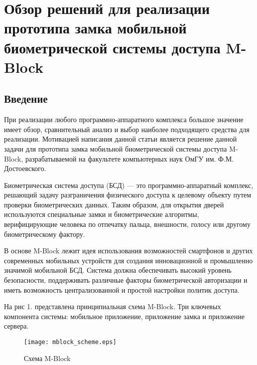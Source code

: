 \chapter{Обзор решений для реализации прототипа замка мобильной биометрической системы доступа M-Block} \label{chapt2}

\section*{Введение} %
При реализации любого программно-аппаратного комплекса большое значение имеет обзор, сравнительный анализ и выбор наиболее подходящего средства для реализации. Мотивацией написания данной статьи является решение данной задачи для прототипа замка мобильной биометрической системы доступа M-Block, разрабатываемой на факультете компьютерных наук ОмГУ им. Ф.М. Достоевского.

Биометрическая система доступа (БСД) --- это программно-аппаратный комплекс, решающий задачу разграничения физического доступа к целевому объекту путем проверки биометрических данных. Таким образом, для открытия дверей используются специальные замки и биометрические алгоритмы, верифицирующие человека по отпечатку пальца, внешности, голосу или другому биометрическому фактору.

В основе M-Block лежит идея использования возможностей смартфонов и других современных мобильных устройств для создания инновационной и промышленно значимой мобильной БСД. Система должна обеспечивать высокий уровень безопасности, поддерживать различные факторы биометрической авторизации и иметь возможность централизованной и простой настройки политик доступа.

На рис 1. представлена принципиальная схема M-Block. Три ключевых компонента системы: мобильное приложение, приложение замка и приложение сервера. 

\begin{figure}[ht] %
\centering
\texttt{[image: mblock\_scheme.eps]}\\
\caption{Схема M-Block}%
\label{pic}%
\end{figure}

